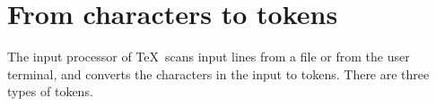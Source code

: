 \documentclass{book}
\begin{document}
\section{From characters to tokens}

The input processor
of \TeX\ scans input lines from a file or from the
user terminal, and converts the characters in the input
to tokens. There are three types of tokens.
\end{document}
